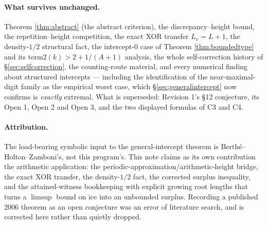 \documentclass[11pt]{article}
\begin{document}
\paragraph{What survives unchanged.} Theorem \ref{thm:abstract} (the abstract criterion), the
discrepancy--height bound, the repetition--height competition, the exact XOR transfer
$L_v=L+1$, the density-$1/2$ structural fact, the intercept-$0$ case of
Theorem \ref{thm:boundedtype} and its $\text{term2}(k)>2+1/(A+1)$ analysis, the whole
self-correction history of \S\ref{sec:selfcorrection}, the counting-route material, and every
numerical finding about structured intercepts --- including the identification of the
near-maximal-digit family as the empirical worst case, which \S\ref{sec:generalintercept} now
confirms is \emph{exactly} extremal. What is superseded: Revision 1's \S12 conjecture, its Open 1,
Open 2 and Open 3, and the two displayed formulas of C3 and C4.

\paragraph{Attribution.} The load-bearing symbolic input to the general-intercept theorem is
Berth\'e--Holton--Zamboni's, not this program's. This note claims as its own contribution the
arithmetic application: the periodic-approximation/arithmetic-height bridge, the exact XOR
transfer, the density-$1/2$ fact, the corrected surplus inequality, and the attained-witness
bookkeeping with explicit growing root lengths that turns a $\limsup$ bound on $\text{ice}$ into an
unbounded surplus. Recording a published 2006 theorem as an open conjecture was an error of
literature search, and is corrected here rather than quietly dropped.
\end{document}
